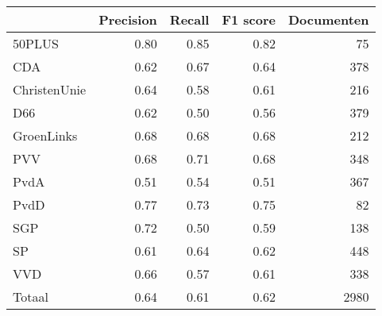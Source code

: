 \begin{tabular}{lrrrr}
\toprule
{} &  Precision &  Recall &  F1 score &  Documenten \\
\midrule
50PLUS       &       0.80 &    0.85 &      0.82 &          75 \\
CDA          &       0.62 &    0.67 &      0.64 &         378 \\
ChristenUnie &       0.64 &    0.58 &      0.61 &         216 \\
D66          &       0.62 &    0.50 &      0.56 &         379 \\
GroenLinks   &       0.68 &    0.68 &      0.68 &         212 \\
PVV          &       0.68 &    0.71 &      0.68 &         348 \\
PvdA         &       0.51 &    0.54 &      0.51 &         367 \\
PvdD         &       0.77 &    0.73 &      0.75 &          82 \\
SGP          &       0.72 &    0.50 &      0.59 &         138 \\
SP           &       0.61 &    0.64 &      0.62 &         448 \\
VVD          &       0.66 &    0.57 &      0.61 &         338 \\
Totaal       &       0.64 &    0.61 &      0.62 &        2980 \\
\bottomrule
\end{tabular}
